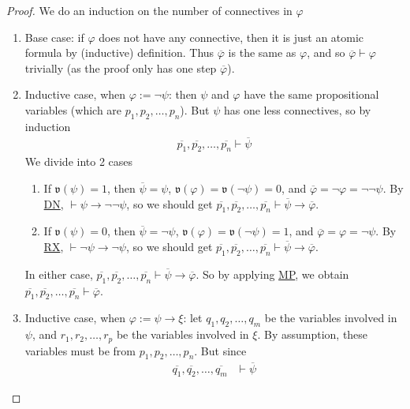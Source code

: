 \documentclass{treatise}
\begin{document}
\begin{proof}
We do an induction on the number of connectives in $\varphi$
\begin{enumerate}
    \item Base case: if $\varphi$ does not have any connective, then it is just an atomic formula by (inductive) definition. Thus $\overline{\varphi}$ is the same as $\varphi$, and so $\overline{\varphi} \vdash \varphi$ trivially (as the proof only has one step $\overline{\varphi}$).
    \item Inductive case, when $\varphi := \neg \psi$: then $\psi$ and $\varphi$ have the same propositional variables (which are $p_1, p_2, \hdots, p_n$). But $\psi$ has one less connectives, so by induction
    \begin{align*}
        \overline{p_1}, \overline{p_2}, \hdots, \overline{p_n} \vdash \overline{\psi}
    \end{align*}
    We divide into 2 cases
    \begin{enumerate}
        \item If $\mathfrak{v}(\psi) = 1$, then $\overline{\psi} = \psi$, $\mathfrak{v}(\varphi) = \mathfrak{v}(\neg \psi) = 0$, and $\overline{\varphi} = \neg \varphi = \neg \neg \psi$. By \hyperref[HPL-T-DN]{DN}, $\vdash \psi \to \neg \neg \psi$, so we should get $\overline{p_1}, \overline{p_2}, \hdots, \overline{p_n} \vdash \overline{\psi} \to \overline{\varphi}$.
        \item If $\mathfrak{v}(\psi) = 0$, then $\overline{\psi} = \neg\psi$, $\mathfrak{v}(\varphi) = \mathfrak{v}(\neg \psi) = 1$, and $\overline{\varphi} =  \varphi = \neg \psi$. By \hyperref[HPL-T-RX]{RX}, $\vdash \neg \psi \to \neg \psi$, so we should get $\overline{p_1}, \overline{p_2}, \hdots, \overline{p_n} \vdash \overline{\psi} \to \overline{\varphi}$.
    \end{enumerate}
    In either case, $\overline{p_1}, \overline{p_2}, \hdots, \overline{p_n} \vdash \overline{\psi} \to \overline{\varphi}$. So by applying \hyperref[HPL-R-MP]{MP}, we obtain $\overline{p_1}, \overline{p_2}, \hdots, \overline{p_n} \vdash \overline{\varphi}$.
    \item Inductive case, when $\varphi := \psi \to \xi$: let $q_1, q_2, \hdots, q_m$ be the variables involved in $\psi$, and $r_1, r_2, \hdots, r_p$ be the variables involved in $\xi$. By assumption, these variables must be from $p_1, p_2, \hdots, p_n$. But since
    \begin{align*}
        \overline{q_1}, \overline{q_2}, \hdots, \overline{q_m} & \vdash \overline{\psi}

\end{align*}
\end{enumerate}
\end{proof}
\end{document}
